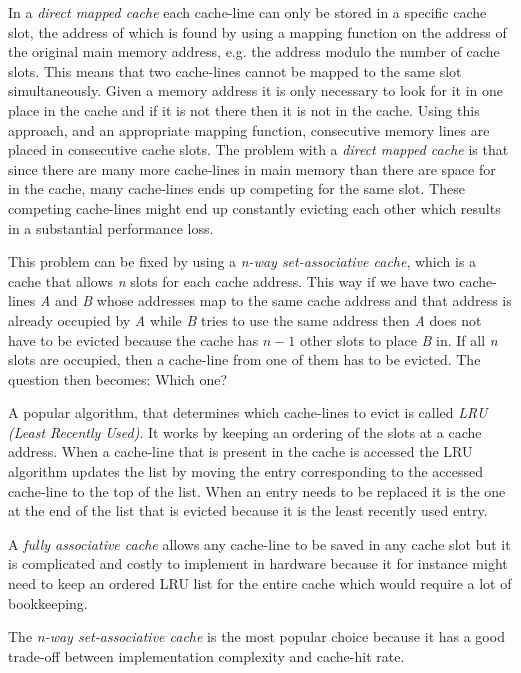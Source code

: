 In a \textit{direct mapped cache} each cache-line can only be stored in a specific cache slot, the address of which is found by using a mapping function on the address of the original main memory address, e.g. the address modulo the number of cache slots.
This means that two cache-lines cannot be mapped to the same slot simultaneously.
Given a memory address it is only necessary to look for it in one place in the cache and if it is not there then it is not in the cache. Using this approach, and an appropriate mapping function, consecutive memory lines are placed in consecutive cache slots. 
The problem with a \textit{direct mapped cache} is that since there are many more cache-lines in main memory than there are space for in the cache, many cache-lines ends up competing for the same slot. 
These competing cache-lines might end up constantly evicting each other which results in a substantial performance loss.

This problem can be fixed by using a \textit{n-way set-associative cache}, which is a cache that allows \textit{n} slots for each cache address.
This way if we have two cache-lines \textit{A} and \textit{B} whose addresses map to the same cache address and that address is already occupied by \textit{A} while \textit{B} tries to use the same address then \textit{A} does not have to be evicted because the cache has $n-1$ other slots to place \textit{B} in.
If all \textit{n} slots are occupied, then a cache-line from one of them has to be evicted.
The question then becomes: Which one?

A popular algorithm, that determines which cache-lines to evict is called \textit{LRU (Least Recently Used)}.
It works by keeping an ordering of the slots at a cache address.
When a cache-line that is present in the cache is accessed the LRU algorithm updates the list by moving the entry corresponding to the accessed cache-line to the top of the list.
When an entry needs to be replaced it is the one at the end of the list that is evicted because it is the least recently used entry.

A \textit{fully associative cache} allows any cache-line to be saved in any cache slot but it is complicated and costly to implement in hardware because it for instance  might need to keep an ordered LRU list for the entire cache which would require a lot of bookkeeping.

The \textit{n-way set-associative cache} is the most popular choice because it has a good trade-off between implementation complexity and cache-hit rate.



